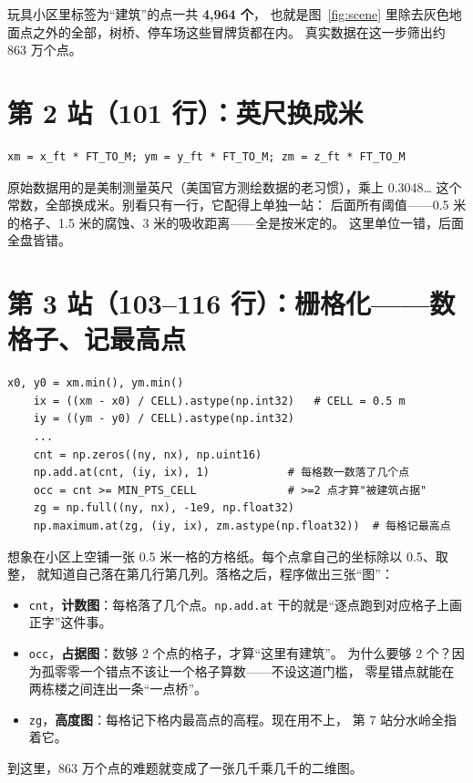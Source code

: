 \documentclass[11pt]{ctexart}
\begin{document}
\begin{toybox}
玩具小区里标签为``建筑''的点一共 \textbf{4{,}964 个}，
也就是图~\ref{fig:scene} 里除去灰色地面点之外的全部，树桥、停车场这些冒牌货都在内。
真实数据在这一步筛出约 863 万个点。
\end{toybox}

\section{第 2 站（101 行）：英尺换成米}

\begin{lstlisting}[firstnumber=101]
    xm = x_ft * FT_TO_M; ym = y_ft * FT_TO_M; zm = z_ft * FT_TO_M
\end{lstlisting}

\begin{whybox}
原始数据用的是美制测量英尺（美国官方测绘数据的老习惯），乘上 0.3048\ldots{}
这个常数，全部换成米。别看只有一行，它配得上单独一站：
后面所有阈值——0.5 米的格子、1.5 米的腐蚀、3 米的吸收距离——全是按米定的。
这里单位一错，后面全盘皆错。
\end{whybox}

\section{第 3 站（103--116 行）：栅格化——数格子、记最高点}

\begin{lstlisting}[firstnumber=104]
    x0, y0 = xm.min(), ym.min()
    ix = ((xm - x0) / CELL).astype(np.int32)   # CELL = 0.5 m
    iy = ((ym - y0) / CELL).astype(np.int32)
    ...
    cnt = np.zeros((ny, nx), np.uint16)
    np.add.at(cnt, (iy, ix), 1)            # 每格数一数落了几个点
    occ = cnt >= MIN_PTS_CELL              # >=2 点才算"被建筑占据"
    zg = np.full((ny, nx), -1e9, np.float32)
    np.maximum.at(zg, (iy, ix), zm.astype(np.float32))  # 每格记最高点
\end{lstlisting}

\begin{whybox}
想象在小区上空铺一张 0.5 米一格的方格纸。每个点拿自己的坐标除以 0.5、取整，
就知道自己落在第几行第几列。落格之后，程序做出三张``图''：
\begin{itemize}
\item \texttt{cnt}，\textbf{计数图}：每格落了几个点。\texttt{np.add.at}
      干的就是``逐点跑到对应格子上画正字''这件事。
\item \texttt{occ}，\textbf{占据图}：数够 2 个点的格子，才算``这里有建筑''。
      为什么要够 2 个？因为孤零零一个错点不该让一个格子算数——不设这道门槛，
      零星错点就能在两栋楼之间连出一条``一点桥''。
\item \texttt{zg}，\textbf{高度图}：每格记下格内最高点的高程。现在用不上，
      第 7 站分水岭全指着它。
\end{itemize}
到这里，863 万个点的难题就变成了一张几千乘几千的二维图。
\end{whybox}
\end{document}
